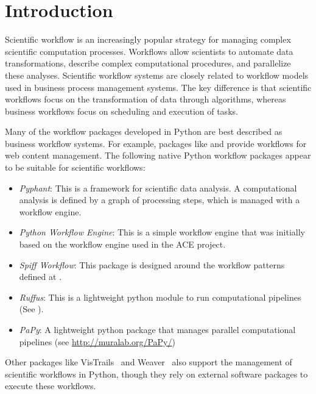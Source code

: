 
\section{Introduction}

Scientific workflow is an increasingly popular strategy for managing
complex scientific computation processes.  Workflows allow scientists to
automate data transformations, describe complex computational procedures,
and parallelize these analyses.  Scientific workflow systems are
closely related to workflow models used in business process management
systems.  The key difference is that scientific workflows focus on the
transformation of data through algorithms, whereas business workflows
focus on scheduling and execution of tasks.

Many of the workflow packages developed in Python are best
described as business workflow systems.  For example, packages like
  and  provide workflows
for web content management.  The following native Python workflow packages
appear to be suitable for scientific workflows:
\begin{itemize}

\item \textit{Pyphant}: This is a framework for scientific data
analysis. A computational analysis is defined by a graph of processing
steps, which is managed with a workflow engine.

\item \textit{Python Workflow Engine}: This is a simple workflow engine
that was initially based on the workflow engine used in the ACE project.

\item \textit{Spiff Workflow}: This package is designed around the
workflow patterns defined at .

\item \textit{Ruffus}: This is a lightweight python module to run computational pipelines (See ).

\item \textit{PaPy}: A lightweight python package that manages parallel computational pipelines (see \url{http://muralab.org/PaPy/})

\end{itemize}
Other packages like VisTrails~\cite{VisTrails} and Weaver~\cite{Weaver}
also support the management of scientific workflows in Python, though
they rely on external software packages to execute these workflows.

